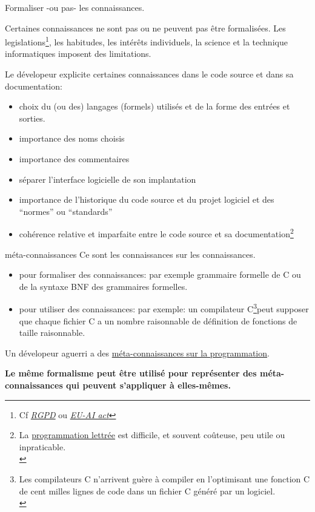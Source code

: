 \documentclass[final,a4,xcolor={svgnames,dvipsnames}]{beamer}
\begin{document}
 \begin{frame}{Formaliser -ou pas- les connaissances.}

   Certaines connaissances ne sont pas ou ne peuvent pas être
   formalisées. Les legislations\footnote{Cf
   \href{https://www.cnil.fr/fr/reglement-europeen-protection-donnees}{\it RGPD}
   ou
   \href{https://artificialintelligenceact.eu/high-level-summary/}{\it EU-AI
     act}}, les habitudes, les intérêts individuels, la science et la
   technique informatiques imposent des limitations.

   \bigskip
   
   Le dévelopeur explicite certaines connaissances dans le code source et
   dans sa documentation:
   \begin{relsize}{-0.5}
   \begin{itemize}
   \item choix du (ou des) langages (formels) utilisés et de la forme des entrées et sorties.
   \item importance des noms choisis
   \item importance des commentaires
   \item séparer l'interface logicielle de son implantation
   \item importance de l'historique du code source et du projet
     logiciel et des ``normes'' ou ``standards''
   \item cohérence relative et imparfaite entre le code source et sa
     documentation\footnote{La \href{https://fr.wikipedia.org/wiki/Programmation_lettrée}{programmation lettrée} est difficile,
     et souvent coûteuse, peu utile ou inpraticable.\medskip\\}
   \end{itemize}
   \end{relsize}
 \end{frame}

 \begin{frame}{méta-connaissances}
   Ce sont les connaissances sur les connaissances.


   \begin{itemize}
   \item pour formaliser des connaissances: par exemple grammaire
     formelle de C ou de la syntaxe BNF des grammaires formelles.
   \item pour utiliser des connaissances: par exemple: un compilateur
     C\footnote{Les compilateurs C n'arrivent guère à compiler en
     l'optimisant une fonction C de cent milles lignes de code dans un
     fichier C généré par un logiciel.\medskip\\}peut supposer que
     chaque fichier C a un nombre raisonnable de définition de
     fonctions de taille raisonnable.
   \end{itemize}

   \bigskip

   Un dévelopeur aguerri a des \href{https://theses.fr/1990PA066799}{méta-connaissances sur la programmation}.
   \bigskip
   
   \textbf{Le même formalisme peut être utilisé pour représenter des
     méta-connaissances qui peuvent s'appliquer à elles-mêmes.}
     
 \end{frame}
\end{document}
